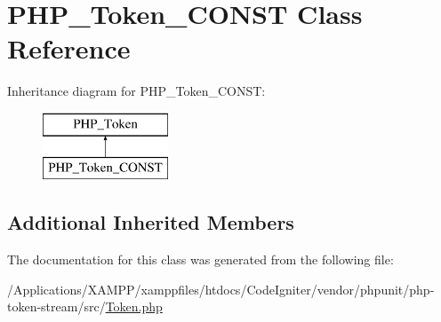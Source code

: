 \hypertarget{class_p_h_p___token___c_o_n_s_t}{}\section{P\+H\+P\+\_\+\+Token\+\_\+\+C\+O\+N\+ST Class Reference}
\label{class_p_h_p___token___c_o_n_s_t}
Inheritance diagram for P\+H\+P\+\_\+\+Token\+\_\+\+C\+O\+N\+ST\+:\begin{figure}[H]
\begin{center}
\leavevmode
\includegraphics[height=2.000000cm]{class_p_h_p___token___c_o_n_s_t}
\end{center}
\end{figure}
\subsection*{Additional Inherited Members}


The documentation for this class was generated from the following file\+:\begin{DoxyCompactItemize}
\item 
/\+Applications/\+X\+A\+M\+P\+P/xamppfiles/htdocs/\+Code\+Igniter/vendor/phpunit/php-\/token-\/stream/src/\mbox{\hyperlink{_token_8php}{Token.\+php}}\end{DoxyCompactItemize}

